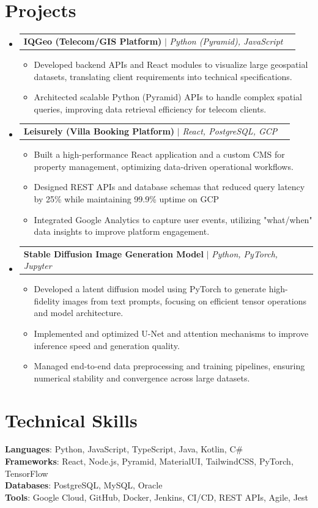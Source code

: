 \documentclass[letterpaper,11pt]{article}
\makeatletter
\newcommand{\resumeItem}[1]{
  \item\small{
    {#1 \vspace{-2pt}}
  }
}
\newcommand{\resumeProjectHeading}[2]{
    \item
    \begin{tabular*}{0.97\textwidth}{l@{\extracolsep{\fill}}r}
      \small#1 & #2 \\
    \end{tabular*}\vspace{-7pt}
}
\newcommand{\resumeSubHeadingListStart}{\begin{itemize}[leftmargin=0.15in, label={}]}
\newcommand{\resumeSubHeadingListEnd}{\end{itemize}}
\newcommand{\resumeItemListStart}{\begin{itemize}}
\newcommand{\resumeItemListEnd}{\end{itemize}\vspace{-5pt}}
\makeatother
\begin{document}
\section{Projects}
    \resumeSubHeadingListStart
      \resumeProjectHeading
          {\textbf{IQGeo (Telecom/GIS Platform)} $|$ \emph{Python (Pyramid), JavaScript}}{}
          \resumeItemListStart
            \resumeItem{Developed backend APIs and React modules to visualize large geospatial datasets, translating client requirements into technical specifications.}
            \resumeItem{Architected scalable Python (Pyramid) APIs to handle complex spatial queries, improving data retrieval efficiency for telecom clients.}
          \resumeItemListEnd
      \resumeProjectHeading
          {\textbf{Leisurely (Villa Booking Platform)} $|$ \emph{React, PostgreSQL, GCP}}{}
          \resumeItemListStart
            \resumeItem{Built a high-performance React application and a custom CMS for property management, optimizing data-driven operational workflows.}
            \resumeItem{Designed REST APIs and database schemas that reduced query latency by 25\% while maintaining 99.9\% uptime on GCP}
            \resumeItem{Integrated Google Analytics to capture user events, utilizing "what/when" data insights to improve platform engagement.}
          \resumeItemListEnd
      \resumeProjectHeading
          {\textbf{Stable Diffusion Image Generation Model} $|$ \emph{Python, PyTorch, Jupyter}}{}
          \resumeItemListStart
            \resumeItem{Developed a latent diffusion model using PyTorch to generate high-fidelity images from text prompts, focusing on efficient tensor operations and model architecture.}
            \resumeItem{Implemented and optimized U-Net and attention mechanisms to improve inference speed and generation quality.}
            \resumeItem{Managed end-to-end data preprocessing and training pipelines, ensuring numerical stability and convergence across large datasets.}
          \resumeItemListEnd
    \resumeSubHeadingListEnd

\section{Technical Skills}
 \begin{itemize}[leftmargin=0.15in, label={}]
    \small{\item{
     \textbf{Languages}{: Python, JavaScript, TypeScript, Java, Kotlin, C\# }  \\
     \textbf{Frameworks}{: React, Node.js, Pyramid, MaterialUI, TailwindCSS, PyTorch, TensorFlow}  \\
     \textbf{Databases}{: PostgreSQL, MySQL, Oracle}  \\
     \textbf{Tools}{: Google Cloud, GitHub, Docker, Jenkins, CI/CD, REST APIs, Agile, Jest} 
    }}
 \end{itemize}

\end{document}

